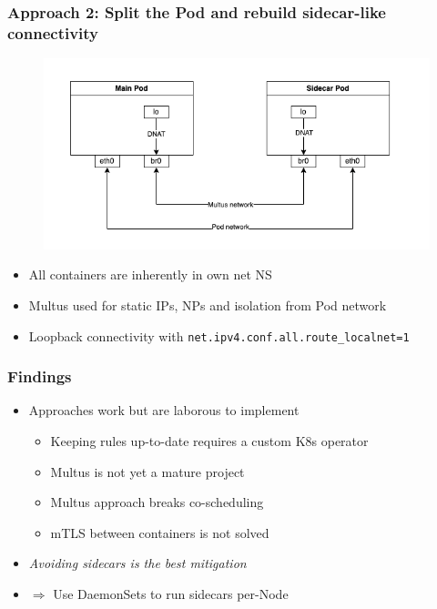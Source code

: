 \documentclass{beamer}
\begin{document}
\begin{frame}
  \frametitle{Approach 2: Split the Pod and rebuild sidecar-like connectivity}

  \begin{figure}[h!]
    \centering
    \includegraphics[width=\linewidth]{../thesis/files/multus.png}
  \end{figure}

  \begin{itemize}
    \item All containers are inherently in own net NS
    \item Multus used for static IPs, NPs and isolation from Pod network
    \item Loopback connectivity with \texttt{net.ipv4.conf.all.route\_localnet=1}
  \end{itemize}
  \end{frame}

\begin{frame}
\frametitle{Findings}

\begin{itemize}
  \item Approaches work but are laborous to implement
  \begin{itemize}
    \item Keeping rules up-to-date requires a custom K8s operator
    \item Multus is not yet a mature project
    \item Multus approach breaks co-scheduling
    \item mTLS between containers is not solved
  \end{itemize}
  \item \emph{Avoiding sidecars is the best mitigation}
  \item $\Rightarrow$ Use DaemonSets to run sidecars per-Node
\end{itemize}
\end{frame}
\end{document}

